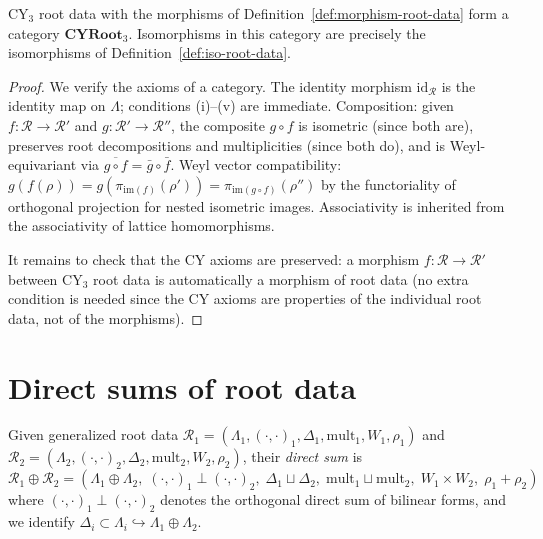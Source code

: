 \begin{proposition}
\label{prop:cy-root-category}

CY$_3$ root data with the morphisms of Definition~\ref{def:morphism-root-data} form a category $\mathbf{CYRoot}_3$. Isomorphisms in this category are precisely the isomorphisms of Definition~\ref{def:iso-root-data}.
\end{proposition}

\begin{proof}
We verify the axioms of a category. The identity morphism $\mathrm{id}_\mathcal{R}$ is the identity map on $\Lambda$; conditions (i)--(v) are immediate. Composition: given $f \colon \mathcal{R} \to \mathcal{R}'$ and $g \colon \mathcal{R}' \to \mathcal{R}''$, the composite $g \circ f$ is isometric (since both are), preserves root decompositions and multiplicities (since both do), and is Weyl-equivariant via $\overline{g \circ f} = \bar{g} \circ \bar{f}$. Weyl vector compatibility: $g(f(\rho)) = g(\pi_{\mathrm{im}(f)}(\rho')) = \pi_{\mathrm{im}(g \circ f)}(\rho'')$ by the functoriality of orthogonal projection for nested isometric images. Associativity is inherited from the associativity of lattice homomorphisms.

It remains to check that the CY axioms are preserved: a morphism $f \colon \mathcal{R} \to \mathcal{R}'$ between CY$_3$ root data is automatically a morphism of root data (no extra condition is needed since the CY axioms are properties of the individual root data, not of the morphisms).
\end{proof}


\section{Direct sums of root data}
\label{sec:direct-sums}

\begin{definition}
\label{def:direct-sum-root-data}
Given generalized root data $\mathcal{R}_1 = (\Lambda_1, (\cdot,\cdot)_1, \Delta_1, \mathrm{mult}_1, W_1, \rho_1)$ and $\mathcal{R}_2 = (\Lambda_2, (\cdot,\cdot)_2, \Delta_2, \mathrm{mult}_2, W_2, \rho_2)$, their \emph{direct sum} is
\[
 \mathcal{R}_1 \oplus \mathcal{R}_2 = (\Lambda_1 \oplus \Lambda_2,\; (\cdot,\cdot)_1 \perp (\cdot,\cdot)_2,\; \Delta_1 \sqcup \Delta_2,\; \mathrm{mult}_1 \sqcup \mathrm{mult}_2,\; W_1 \times W_2,\; \rho_1 + \rho_2)
\]
where $(\cdot,\cdot)_1 \perp (\cdot,\cdot)_2$ denotes the orthogonal direct sum of bilinear forms, and we identify $\Delta_i \subset \Lambda_i \hookrightarrow \Lambda_1 \oplus \Lambda_2$.
\end{definition}

